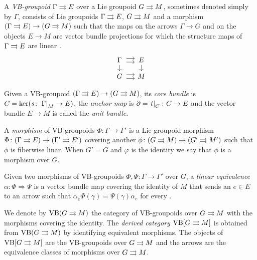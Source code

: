 %
%

A \emph{VB-groupoid} $\Gamma\rightrightarrows E$ over a Lie groupoid $G\rightrightarrows M$, sometimes denoted simply by $\Gamma$, consists of Lie groupoids $\Gamma\rightrightarrows E$, $G\rightrightarrows M$ and a morphism $(\Gamma\rightrightarrows E)\to (G\rightrightarrows M)$ such that the maps on the arrows $\Gamma\to G$ and on the objects $E\to M$ are vector bundle projections for which the structure maps of $\Gamma\rightrightarrows E$ are linear \cite{mack05}.
\begin{equation}
\begin{tikzcd}[sep=small, cells={text width={width("$M$")}}, align=center]
  \Gamma \ar[yshift=3pt]{r} \ar[yshift=-2.3pt]{r} \ar{d} & E \ar{d} \\
  G \ar[yshift=3pt]{r} \ar[yshift=-2.3pt]{r} & M
\end{tikzcd}
\end{equation}

Given a VB-groupoid $(\Gamma\rightrightarrows E)\to (G\rightrightarrows M)$, its \emph{core bundle} is $C=\ker(s\colon\left.\Gamma\right|_{M}\to E)$, the \emph{anchor map} is $\partial=\left.t\right|_{C}\colon C\to E$ and the vector bundle $E\to M$ is called the \emph{unit bundle}.

A \emph{morphism} of VB-groupoids $\Phi\colon\Gamma\to\Gamma'$ is a Lie groupoid morphism $\Phi\colon(\Gamma\rightrightarrows E)\to(\Gamma'\rightrightarrows E')$ covering another $\phi\colon(G\rightrightarrows M)\to (G'\rightrightarrows M')$ such that $\phi$ is fiberwise linar.
When $G'=G$ and $\varphi$ is the identity we say that $\phi$ is a morphism over $G$.

Given  two morphisms of VB-groupoids $\Phi,\Psi\colon\Gamma\to \Gamma'$ over $G$, a \emph{linear equivalence}
$\alpha\colon\Phi\Rightarrow\Psi$ is a vector bundle map  covering the identity of $M$
that sends an $e\in E$ to an arrow  such that $\alpha_{\tilde e} \Phi(\gamma) = \Psi(\gamma) \alpha_e$ for every .

We denote by $\mathrm{VB}(G\rightrightarrows M)$ the category of VB-groupoids over $G\rightrightarrows M$ with the morphisms covering the identity.
The \emph{derived category} $\mathrm{VB}[G\rightrightarrows M]$ is obtained from $\mathrm{VB}(G\rightrightarrows M)$ by identifying equivalent morphisms.
The objects of $\mathrm{VB}[G\rightrightarrows M]$ are the VB-groupoids over $G\rightrightarrows M$ and the arrows are the equivalence classes of morphisms over $G\rightrightarrows M$.

